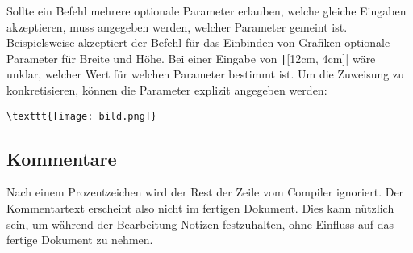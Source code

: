 \begin{table}[h!]
	\caption{Beispiele für \LaTeX-Befehle}
	\label{tbl:latex-commands}
\end{table}

Sollte ein Befehl mehrere optionale Parameter erlauben, welche gleiche Eingaben akzeptieren, muss angegeben werden, welcher Parameter gemeint ist. Beispielsweise akzeptiert der Befehl für das Einbinden von Grafiken optionale Parameter für Breite und Höhe. Bei einer Eingabe von \texttt|[12cm, 4cm]| wäre unklar, welcher Wert für welchen Parameter bestimmt ist. Um die Zuweisung zu konkretisieren, können die Parameter explizit angegeben werden:
\begin{verbatim}
\texttt{[image: bild.png]}
\end{verbatim}

\subsection{Kommentare}
\label{sub:kommentare}
Nach einem Prozentzeichen wird der Rest der Zeile vom Compiler ignoriert. Der Kommentartext erscheint also nicht im fertigen Dokument. Dies kann nützlich sein, um während der Bearbeitung Notizen festzuhalten, ohne Einfluss auf das fertige Dokument zu nehmen. 
